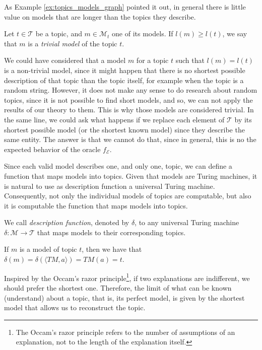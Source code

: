 As Example \ref{ex:topics_models_graph} pointed it out, in general there is little value on models that are longer than the topics they describe.

\begin{definition}
\label{def:trivial_model}
Let $t \in \mathcal{T}$ be a topic, and $m \in \mathcal{M}_t$ one of its models. If $l(m) \geq l(t)$, we say that $m$ is a \emph{trivial model} of the topic $t$.
\end{definition}

We could have considered that a model $m$ for a topic $t$ such that $l(m) = l(t)$ is a non-trivial model, since it might happen that there is no shortest possible description of that topic than the topic itself, for example when the topic is a random string. However, it does not make any sense to do research about random topics, since it is not possible to find short models, and so, we can not apply the results of our theory to them. This is why those models are considered trivial. In the same line, we could ask what happens if we replace each element of $\mathcal{T}$ by its shortest possible model (or the shortest known model) since they describe the same entity. The answer is that we cannot do that, since in general, this is no the expected behavior of the oracle $f_\mathcal{E}$.

Since each valid model describes one, and only one, topic, we can define a function that maps models into topics. Given that models are Turing machines, it is natural to use as description function a universal Turing machine. Consequently, not only the individual models of topics are computable, but also it is computable the function that maps models into topics.

\begin{definition}
We call \emph{description function}, denoted by $\delta$, to any universal Turing machine $\delta : \mathcal{M} \rightarrow \mathcal{T}$ that maps models to their corresponding topics.
\end{definition}

If $m$ is a model of topic $t$, then we have that $\delta \left( m \right) = \delta \left( \langle TM,a\rangle \right) = TM(a) = t$.

Inspired by the Occam's razor principle\footnote{The Occam's razor principle refers to the number of assumptions of an explanation, not to the length of the explanation itself.}, if two explanations are indifferent, we should prefer the shortest one. Therefore, the limit of what can be known (understand) about a topic, that is, its perfect model, is given by the shortest model that allows us to reconstruct the topic.

